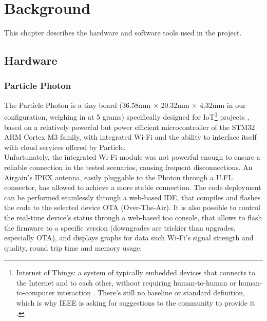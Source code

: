 \chapter{Background}
This chapter describes the hardware and software tools used in the project.

\section{Hardware}
\subsection{Particle Photon}
The Particle Photon is a tiny board (36.58mm $\times$ 20.32mm $\times$ 4.32mm in our configuration, weighing in at 5 grams) specifically designed for IoT\footnote{Internet of Things: a system of typically embedded devices that connects to the Internet and to each other, without requiring human-to-human or human-to-computer interaction \cite{WikipediaIoT}. There's still no baseline or standard definition, which is why IEEE is asking for suggestions to the community to provide it \cite{IEEEIoT}.} projects \cite{ParticlePhoton}, based on a relatively powerful but power efficient microcontroller of the STM32 ARM Cortex M3 family, with integrated Wi-Fi and the ability to interface itself with cloud services offered by Particle.\\
Unfortunately, the integrated Wi-Fi module was not powerful enough to ensure a reliable connection in the tested scenarios, causing frequent disconnections. An Airgain's IPEX antenna, easily pluggable to the Photon through a U.FL connector, has allowed to achieve a more stable connection.
The code deployment can be performed seamlessly through a web-based IDE, that compiles and flashes the code to the selected device OTA (Over-The-Air). It is also possible to control the real-time device's status through a web-based too console, that allows to flash the firmware to a specific version (downgrades are trickier than upgrades, especially OTA), and displays graphs for data such Wi-Fi's signal strength and quality, round trip time and memory usage.

